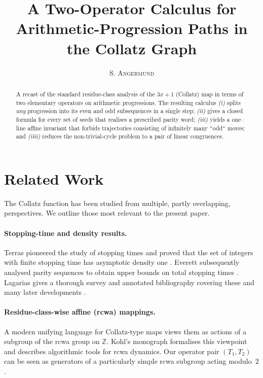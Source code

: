 \documentclass{article}
\title{A Two-Operator Calculus for Arithmetic-Progression Paths in the Collatz Graph}
\author{\textsc{S. Angermund}}
\theoremstyle{definition}
\begin{document}
\maketitle

\begin{abstract}
\noindent
A recast of the standard residue-class analysis of the \(3x+1\) (Collatz) map in
terms of two elementary operators on arithmetic progressions.  The resulting
calculus \emph{(i)} splits \emph{any} progression into its even and odd
subsequences in a single step; \emph{(ii)} gives a closed formula for every set
of seeds that realises a prescribed parity word; \emph{(iii)} yields a
one–line affine invariant that forbids trajectories consisting of infinitely
many “odd“ moves; and \emph{(iiii)} reduces the non-trivial-cycle problem to a pair of linear congruences.
\end{abstract}

\section*{Related Work}\label{sec:related}

The Collatz function has been studied from multiple, partly overlapping,
perspectives.  We outline those most relevant to the present paper.

\paragraph{Stopping-time and density results.}
Terras pioneered the study of stopping times and proved that the set of
integers with finite stopping time has asymptotic density one
\cite{Terras1976}.  Everett subsequently analysed parity sequences to obtain
upper bounds on total stopping times \cite{Everett1977}.  Lagarias gives a
thorough survey and annotated bibliography covering these and many later
developments \cite{LagariasBib2003}.

\paragraph{Residue-class-wise affine (rcwa) mappings.}
A modern unifying language for Collatz-type maps views them as actions of a
subgroup of the rcwa group on \(\mathbb Z\).  Kohl’s monograph
\cite{KohlRCWA2012} formalises this viewpoint and describes algorithmic tools
for rcwa dynamics.  Our operator pair \((T_1,T_2)\) can be seen as generators
of a particularly simple rcwa subgroup acting modulo~\(2\).
\end{document}
